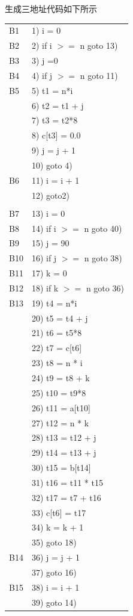 \documentclass[a4paper, 16pt]{article}
\begin{document}
生成三地址代码如下所示
\begin{table}[H]
\centering
\begin{tabular}{l l}
B1&1) i = 0\\
B2&2) if i $>=$ n goto 13) \\
B3&3) j =0 \\
B4&4) if j $>=$ n goto 11) \\
B5&5) t1 = n*i \\
&6) t2 = t1 + j\\
&7) t3 = t2*8\\
&8) c[t3] = 0.0\\
&9) j = j + 1\\
&10) goto 4)\\
B6& 11) i = i + 1\\
& 12) goto2) \\
& \\
B7&13) i = 0 \\
B8&14) if i $>=$ n goto 40) \\
B9&15) j = 90 \\
B10& 16) if j $>=$ n goto 38) \\
B11& 17) k = 0\\
B12& 18) if k $>=$ n goto 36)\\
B13&19) t4 = n*i\\
&20) t5 = t4 + j\\
&21) t6 = t5*8\\
&22) t7 = c[t6]\\
&23) t8 = n * i\\
&24) t9 = t8 + k\\
&25) t10 = t9*8 \\
&26) t11 = a[t10]\\
&27) t12 = n * k\\
&28) t13 = t12 + j\\
&29) t14 = t13 + j\\
&30) t15 = b[t14]\\
&31) t16 = t11 * t15\\
&32) t17 = t7 + t16\\
& 33) c[t6] = t17\\
&34) k = k + 1\\
&35) goto 18)\\

B14&36) j = j + 1\\
&37) goto 16)\\
B15&38) i = i + 1\\
& 39) goto 14)\\
\end{tabular}
\end{table}
\end{document}
